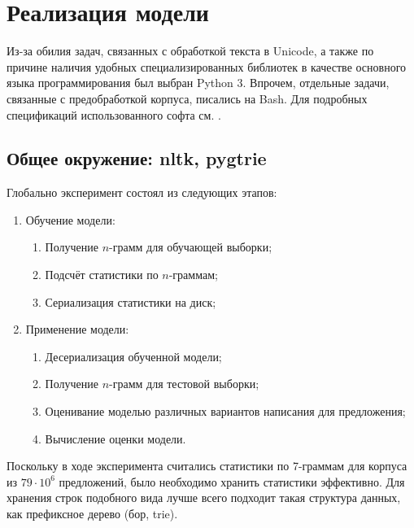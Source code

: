 
\section{ Реализация модели }\label{sec:coding}

Из-за обилия задач, связанных с обработкой текста в Unicode, а также по причине наличия удобных специализированных библиотек в качестве основного языка программирования был выбран Python 3. Впрочем, отдельные задачи, связанные с предобработкой корпуса, писались на Bash. Для подробных спецификаций использованного софта см. .

\subsection{ Общее окружение: nltk, pygtrie }

Глобально эксперимент состоял из следующих этапов:

\begin{enumerate}
	\item Обучение модели:
	
	\begin{enumerate}
		\item Получение $n$-грамм для обучающей выборки;
		
		\item Подсчёт статистики по $n$-граммам;
		
		\item Сериализация статистики на диск;
	\end{enumerate}
	
	\item Применение модели:
	\begin{enumerate}
		\item Десериализация обученной модели;
	
		\item Получение $n$-грамм для тестовой выборки;
	
		\item Оценивание моделью различных вариантов написания для предложения;
		
		\item Вычисление оценки модели.
	\end{enumerate}	
\end{enumerate}

Поскольку в ходе эксперимента считались статистики по 7-граммам для корпуса из $79 \cdot 10^6$ предложений, было необходимо хранить статистики эффективно. Для хранения строк подобного вида лучше всего подходит такая структура данных, как префиксное дерево (бор, trie).

